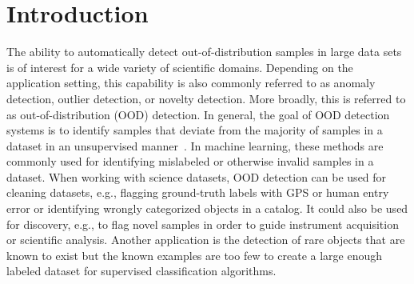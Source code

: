 \documentclass[utf8]{frontiersFPHY} %
\begin{document}
\section{Introduction}

The ability to automatically detect out-of-distribution samples in large data 
sets is of interest for a wide variety of scientific domains. Depending on the
application setting, this capability is also commonly referred to as anomaly
detection, outlier detection, or novelty detection. More broadly, this is 
referred to as out-of-distribution (OOD) detection. In general, the goal of 
OOD detection systems is to identify samples that deviate from the majority
of samples in a dataset in an unsupervised manner~\cite{pimentel2014review}. 
In machine learning, these methods are commonly used for identifying 
mislabeled or otherwise invalid samples in a dataset. When working with 
science datasets, OOD detection can be used for 
cleaning datasets, e.g., flagging ground-truth labels with GPS or human
entry error or identifying wrongly categorized objects in a catalog. 
It could also be used for discovery, e.g., to flag novel samples in order 
to guide instrument acquisition or scientific analysis. Another application
is the detection of rare objects that are known to exist but the known
examples are too few to create a large enough labeled dataset for 
supervised classification algorithms. 
\end{document}
